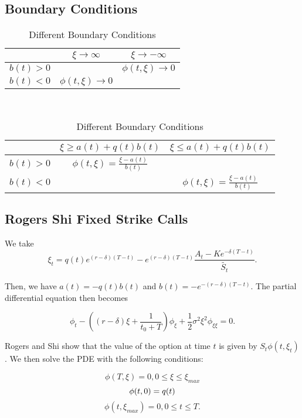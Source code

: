 \documentclass{article}
\begin{document}
\subsection{Boundary Conditions}
\begin{table}[H]
  \begin{tabular}{|c|c|c|}
    \hline
    & \(\xi \rightarrow \infty\) & \(\xi \rightarrow -\infty\) \\
    \hline
    \(b(t) > 0\) &  & \(\phi(t, \xi) \rightarrow 0\) \\
    \(b(t) < 0\) & \(\phi(t, \xi) \rightarrow 0\) & \\
    \hline
  \end{tabular}\\
  \begin{tabular}{|c|c|c|}
    \hline
    & \(\xi \ge a(t) + q(t)b(t)\) & \(\xi \le a(t) + q(t)b(t)\) \\
    \hline
    \(b(t) > 0\) & \(\phi(t, \xi) = \frac{\xi-a(t)}{b(t)} \) & \\
    \(b(t) < 0\) &  & \( \phi(t, \xi) = \frac{\xi-a(t)}{b(t)} \) \\
    \hline
  \end{tabular}
  \caption{Different Boundary Conditions}
\end{table}

\subsection{Rogers Shi Fixed Strike Calls}
We take
\begin{equation}
  \xi_t = q(t)e^{(r-\delta)(T-t)} - e^{(r-\delta)(T-t)}\frac{A_t - Ke^{-\delta(T-t)}}{\tilde{S_t}}.
\end{equation}

Then, we have \( a(t) = -q(t)b(t) \) and \(b(t) = -e^{-(r-\delta)(T-t)}\). The partial differential equation then becomes

\begin{equation}
  \phi_t - ( (r-\delta)\xi + \frac{1}{t_0 + T} ) \phi_\xi + \frac{1}{2}\sigma^2\xi^2\phi_{\xi\xi} = 0.
\end{equation}

Rogers and Shi show that the value of the option at time \(t\) is given by \(S_t\phi(t, \xi_t)\). We then solve the PDE with the following conditions:

\begin{equation}
  \phi(T, \xi) = 0, 0 \le \xi \le \xi_{max}
\end{equation}
\begin{equation}
  \phi(t, 0) = q(t) \\
\end{equation}
\begin{equation}
  \phi(t, \xi_{max}) = 0, 0 \le t \le T.
\end{equation}
\end{document}
